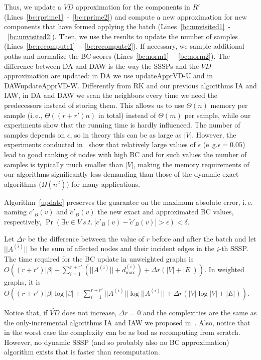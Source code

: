 \documentclass[english]{llncs}
\newcommand{\ie}{i.\,e.\xspace}
\newcommand{\eg}{e.\,g.\xspace}
\newcommand{\vd}{$\mathit{VD}$\xspace}
\newcommand{\rk}{\textsf{RK}\xspace}
\newcommand{\ia}{\textsf{IA}\xspace}
\newcommand{\iaw}{\textsf{IAW}\xspace}
\newcommand{\da}{\textsf{DA}\xspace}
\newcommand{\daw}{\textsf{DAW}\xspace}
\newcommand{\vda}{$\tilde{\mathit{VD}}$\xspace}
\newcommand{\upvd}{\textsf{updateApprVD-W}\xspace}
\newcommand{\upvdu}{\textsf{updateApprVD-U}\xspace}
\begin{document}
Thus, we update a \vd approximation for the components in $R'$ (Lines~\ref{bc:rprime1}~-~\ref{bc:rprime2}) and compute a new approximation for new components that have formed applying the batch (Lines~\ref{bc:unvisited1}~-~\ref{bc:unvisited2}). Then, we use the results to update the number of samples (Lines~\ref{bc:recompute1}~-~\ref{bc:recompute2}). If necessary, we sample additional paths and normalize the BC scores (Lines~\ref{bc:norm1}~-~\ref{bc:norm2}). The difference between \da and \daw is the way the SSSPs and the \vd approximation are updated: in \da we use \upvdu and in \daw \upvd. Differently from \rk and our previous algorithms \ia and \iaw, in \da and \daw we scan the neighbors every time we need the predecessors instead of storing them. This allows us to use $\Theta(n)$ memory per sample (\ie, $\Theta((r+r')n)$ in total) instead of $\Theta(m)$ per sample, while our experiments show that the running time is hardly influenced. The number of samples depends on $\epsilon$, so in theory this can be as large as $|V|$. However, the experiments conducted in~\cite{DBLP:conf/alenex/BergaminiMS15} show that relatively large values of $\epsilon$ (\eg $\epsilon=0.05$) lead to good ranking of nodes with high BC and for such values the number of samples is typically much smaller than $|V|$, making the memory requirements of our algorithms significantly less demanding than those of the dynamic exact algorithms ($\Omega(n^2)$) for many applications.
 \begin{theorem}
\label{thm:correctness_bc}
Algorithm~\ref{update} preserves the guarantee on the maximum absolute error, \ie naming $c'_{B}(v)$ and $\tilde{c}'_B(v)$ the new exact and approximated BC values, respectively, $\Pr(\exists v\in V\: s.t.\:|c'_{B}(v)-\tilde{c}'_B(v)|>\epsilon)<\delta$.

\end{theorem}
\begin{theorem}
\label{thm:complexity_bc}
Let $\Delta r$ be the difference between the value of $r$ before and after the batch and let $||A^{(i)}||$ be the sum of affected nodes and their incident edges in the $i$-th SSSP. The time required for the BC update in unweighted graphs is 
$O((r+r') |\beta | + \sum_{i=1}^{r+r'} (||A^{(i)}||+d_{\max}^{(i)}) + \Delta r(|V|+|E|))$. 
In weighted graphs, it is $O((r+r') |\beta |\log |\beta | + \sum_{i=1}^{r+r'} ||A^{(i)}|| \log ||A^{(i)}|| + \Delta r(|V|\log |V|+|E|))$.
\end{theorem}
Notice that, if \vda does not increase, $\Delta r = 0$ and the complexities are the same as the only-incremental algorithms \textsf{IA} and \textsf{IAW} we proposed in~\cite{DBLP:conf/alenex/BergaminiMS15}. Also, notice that in the worst case the complexity can be as bad as recomputing from scratch. However, no dynamic SSSP (and so probably also no BC approximation) algorithm exists that is faster than recomputation. 
\end{document}
